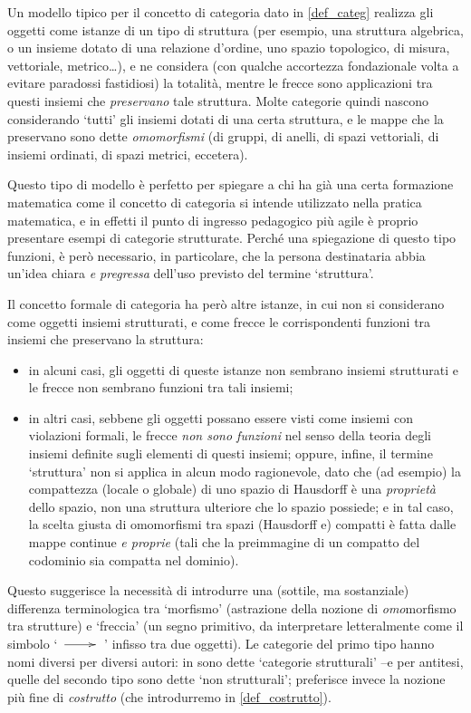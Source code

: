 \begin{remark}\label{frecce_o_morfismi}
	Un modello tipico per il concetto di categoria dato in \ref{def_categ} realizza gli oggetti come istanze di un tipo di struttura (per esempio, una struttura algebrica, o un insieme dotato di una relazione d'ordine, uno spazio topologico, di misura, vettoriale, metrico\dots), e ne considera (con qualche accortezza fondazionale volta a evitare paradossi fastidiosi) la totalità, mentre le frecce sono applicazioni tra questi insiemi che \emph{preservano} tale struttura. Molte categorie quindi nascono considerando `tutti' gli insiemi dotati di una certa struttura, e le mappe che la preservano sono dette \emph{omomorfismi} (di gruppi, di anelli, di spazi vettoriali, di insiemi ordinati, di spazi metrici, eccetera).

	Questo tipo di modello è perfetto per spiegare a chi ha già una certa formazione matematica come il concetto di categoria si intende utilizzato nella pratica matematica, e in effetti il punto di ingresso pedagogico più agile è proprio presentare esempi di categorie strutturate. Perché una spiegazione di questo tipo funzioni, è però necessario, in particolare, che la persona destinataria abbia un'idea chiara \emph{e pregressa} dell'uso previsto del termine `struttura'.

	Il concetto formale di categoria ha però altre istanze, in cui non si considerano come oggetti insiemi strutturati, e come frecce le corrispondenti funzioni tra insiemi che preservano la struttura:
	\begin{itemize}
		\item in alcuni casi, gli oggetti di queste istanze non sembrano insiemi strutturati e le frecce non sembrano funzioni tra tali insiemi;
		\item in altri casi, sebbene gli oggetti possano essere visti come insiemi con violazioni formali, le frecce \emph{non sono funzioni} nel senso della teoria degli insiemi definite sugli elementi di questi insiemi; oppure, infine, il termine `struttura' non si applica in alcun modo ragionevole, dato che (ad esempio) la compattezza (locale o globale) di uno spazio di Hausdorff è una \emph{proprietà} dello spazio, non una struttura ulteriore che lo spazio possiede; e in tal caso, la scelta giusta di omomorfismi tra spazi (Hausdorff e) compatti è fatta dalle mappe continue \emph{e proprie} (tali che la preimmagine di un compatto del codominio sia compatta nel dominio).
	\end{itemize}
	Questo suggerisce la necessità di introdurre una (sottile, ma sostanziale) differenza terminologica tra `morfismo' (astrazione della nozione di \emph{omo}morfismo tra strutture) e `freccia' (un segno primitivo, da interpretare letteralmente come il simbolo `\(\xymatrix{ \ar[r] & }\)' infisso tra due oggetti). Le categorie del primo tipo hanno nomi diversi per diversi autori: in \cite[5.3.1.5]{kromer} sono dette `categorie strutturali' --e per antitesi, quelle del secondo tipo sono dette `non strutturali'; \cite{acc} preferisce invece la nozione più fine di \emph{costrutto} (che introdurremo in \ref{def_costrutto}).
\end{remark}
